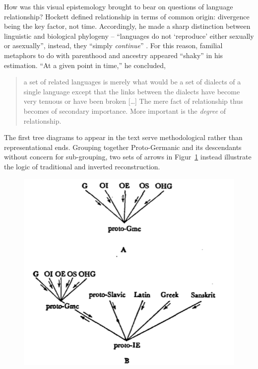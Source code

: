 \documentclass[output=paper]{langscibook}
\begin{document}
How was this visual epistemology brought to bear on questions of language relationship? Hockett defined relationship in terms of common origin: divergence being the key factor, not time. Accordingly, he made a sharp distinction between linguistic and biological phylogeny – ``languages do not `reproduce' either sexually or asexually'', instead, they ``simply \emph{continue}'' \citep[369]{Hockett19591958}. For this reason, familial metaphors to do with parenthood and ancestry appeared ``shaky'' in his estimation. ``At a given point in time,'' he concluded,

\begin{quotation}
a set of related languages is merely what would be a set of dialects of a single language except that the links between the dialects have become very tenuous or have been broken […] The mere fact of relationship thus becomes of secondary importance. More important is the \emph{degree} of relationship. \citep[369]{Hockett19591958}
\end{quotation}

The first tree diagrams to appear in the text serve methodological rather than representational ends. Grouping together Proto-Germanic and its descendants without concern for sub-grouping, two sets of arrows in Figur~\ref{fig:kaplan:hockett1959514} instead illustrate the logic of traditional and inverted reconstruction.

\begin{figure}
    \centering
    \includegraphics[scale=1]{figures/hockett1958-514.png}
    \caption{\citet[514]{Hockett19591958}}
    \label{fig:kaplan:hockett1959514}
\end{figure}
\end{document}
